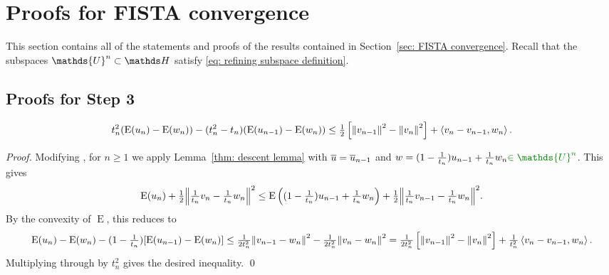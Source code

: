 \documentclass[smallextended]{svjour3}
\let\F\mathds\let\C\mathcal\newcommand{\R}{\F{R}}\newcommand{\A}{\tens{A}}
\newcommand{\norm}[1]{{\left\lVert #1 \right\rVert}}
\newcommand{\IP}[2]{\left\langle #1,#2 \right\rangle}
\newcommand{\op}[1]{\operatorname{#1}}
\newcommand{\1}{\F{1}}
\newcommand*{\varf}[1]{%
	\IfEqCase{#1}{%
		{0}{u}%
		{1}{v}%
		{2}{w}%
	}[u#1]%
}
\newcommand*{\spcf}[1]{%
	\IfEqCase{#1}{%
		{0}{\F{U}}%
		{1}{\F{V}}%
		{2}{\F{W}}%
	}[\F{U}#1]%
}
\newcommand{\edit}[2]{{\ifmmode\text{\color{red}\sout{\ensuremath{#1}}}\else {\color{red} \sout{#1}}\fi} {\color{darkgreen} #2}}
\begin{document}
	\section{Proofs for FISTA convergence}\label{app: FISTA convergence}
	This section contains all of the statements and proofs of the results contained in Section~\ref{sec: FISTA convergence}. \edit{}{Recall that the subspaces $\spcf0^n\subset\F H$ satisfy \eqref{eq: refining subspace definition}.}
	
	\subsection{Proofs for Step 3}
	
	\begin{theorem}\label{app:thm: one step FISTA}
		\begin{equation}
			t_{n}^2(\op{E}(\varf0_{n}) - \op{E}(\varf2_n)) - (t_{n}^2-t_{n})(\op{E}(\varf0_{n-1})-\op{E}(\varf2_n)) \leq \tfrac1{2}\left[\norm{\varf1_{n-1}}^2-\norm{\varf1_{n}}^2\right] + \IP{\varf1_{n}-\varf1_{n-1}}{\varf2_n}.
			\label{app:eq: one-step FISTA}
		\end{equation}
	\end{theorem}
	\begin{proof}
		Modifying \cite[\edit{Theorem 2}{Thm 3.2}]{Chambolle2015}, for $n\geq1$ we apply Lemma~\ref{thm: descent lemma} with $\bar{\varf0} = \bar{\varf0}_{n-1}$ and $\varf2 = (1-\frac{1}{t_{n}})\varf0_{n-1} + \frac{1}{t_{n}}\varf2_n\edit{}{\in\spcf0^n}$. This gives
		\begin{equation}
			\op{E}(\varf0_{n}) + \tfrac12\norm{\tfrac{1}{t_{n}}\varf1_{n}-\tfrac{1}{t_{n}}\varf2_n}^2 \leq \op{E}\left((1-\tfrac{1}{t_{n}})\varf0_{n-1}+\tfrac{1}{t_{n}}\varf2_n\right) + \tfrac12\norm{\tfrac{1}{t_{n}}\varf1_{n-1}-\tfrac{1}{t_{n}}\varf2_n}^2.
		\end{equation}
		By the convexity of $\op{E}$, this reduces to
		\begin{equation}
			\op{E}(\varf0_{n}) - \op{E}(\varf2_n) - (1-\tfrac{1}{t_{n}})[\op{E}(\varf0_{n-1})-\op{E}(\varf2_n)] \leq \tfrac1{2t_{n}^2}\norm{\varf1_{n-1}-\varf2_n}^2 - \tfrac1{2t_{n}^2}\norm{\varf1_{n}-\varf2_n}^2 = \tfrac1{2t_{n}^2}\left[\norm{\varf1_{n-1}}^2-\norm{\varf1_{n}}^2\right] + \tfrac1{t_{n}^2}\IP{\varf1_{n}-\varf1_{n-1}}{\varf2_n}.
		\end{equation}
		\edit{}{Multiplying through by $t_n^2$ gives the desired inequality.}
		\qed\end{proof}
	
\end{document}
